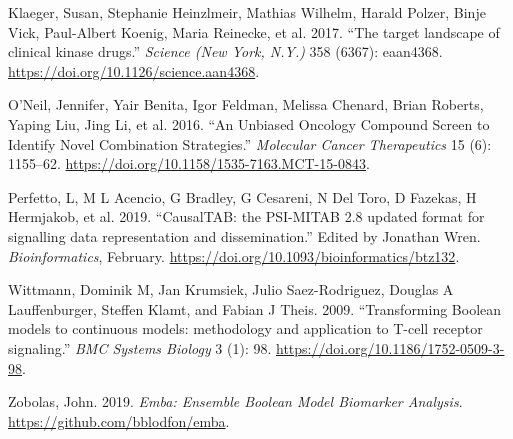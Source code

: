 \documentclass[12pt,]{book}
\begin{document}
\leavevmode\hypertarget{ref-Klaeger2017}{}%
Klaeger, Susan, Stephanie Heinzlmeir, Mathias Wilhelm, Harald Polzer, Binje Vick, Paul-Albert Koenig, Maria Reinecke, et al. 2017. ``The target landscape of clinical kinase drugs.'' \emph{Science (New York, N.Y.)} 358 (6367): eaan4368. \url{https://doi.org/10.1126/science.aan4368}.

\leavevmode\hypertarget{ref-ONeil2016}{}%
O'Neil, Jennifer, Yair Benita, Igor Feldman, Melissa Chenard, Brian Roberts, Yaping Liu, Jing Li, et al. 2016. ``An Unbiased Oncology Compound Screen to Identify Novel Combination Strategies.'' \emph{Molecular Cancer Therapeutics} 15 (6): 1155--62. \url{https://doi.org/10.1158/1535-7163.MCT-15-0843}.

\leavevmode\hypertarget{ref-Perfetto2019}{}%
Perfetto, L, M L Acencio, G Bradley, G Cesareni, N Del Toro, D Fazekas, H Hermjakob, et al. 2019. ``CausalTAB: the PSI-MITAB 2.8 updated format for signalling data representation and dissemination.'' Edited by Jonathan Wren. \emph{Bioinformatics}, February. \url{https://doi.org/10.1093/bioinformatics/btz132}.

\leavevmode\hypertarget{ref-Wittmann2009}{}%
Wittmann, Dominik M, Jan Krumsiek, Julio Saez-Rodriguez, Douglas A Lauffenburger, Steffen Klamt, and Fabian J Theis. 2009. ``Transforming Boolean models to continuous models: methodology and application to T-cell receptor signaling.'' \emph{BMC Systems Biology} 3 (1): 98. \url{https://doi.org/10.1186/1752-0509-3-98}.

\leavevmode\hypertarget{ref-R-emba}{}%
Zobolas, John. 2019. \emph{Emba: Ensemble Boolean Model Biomarker Analysis}. \url{https://github.com/bblodfon/emba}.
\end{document}
